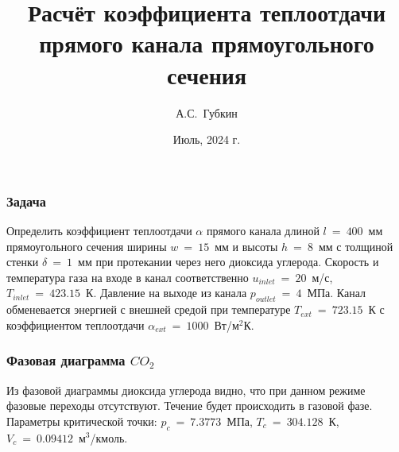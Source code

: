 \documentclass[10pt,xcolor={dvipsnames,table},aspectratio=169]{beamer}
\author[Губкин]{А.С.~Губкин}
\title[Расчёт коэффициента теплоотдачи прямого канала прямоугольного сечения]{Расчёт коэффициента теплоотдачи прямого канала прямоугольного сечения}
\date[Тюмень 2024]{Июль, 2024 г.}
\begin{document}
    \frame{\titlepage}

    \begin{frame}{}

        \justifying
        \normalsize

        \frametitle{Задача}

        Определить коэффициент теплоотдачи $ \alpha $ прямого канала длиной $ l~=~400$~мм прямоугольного сечения ширины $ w~=~15 $~мм и высоты $ h~=~8 $~мм с толщиной стенки $ \delta~=~1 $~мм при протекании через него диоксида углерода. Скорость и температура газа на входе в канал соответственно $ u_{inlet}~=~20 $~м/с, $ T_{inlet}~=~423.15 $~К. Давление на выходе из канала $ p_{outlet}~=~4 $~МПа. Канал обменевается энергией с внешней средой при температуре $ T_{ext}~=~723.15 $~К с коэффициентом теплоотдачи $ \alpha_{ext}~=~1000 $~Вт/м$^2$К.

    \end{frame}{}

    \begin{frame}{}

        \justifying
        \normalsize

        \frametitle{Фазовая диаграмма $CO_{2}$}

        \begin{minipage}[b]{0.49\linewidth}
            Из фазовой диаграммы диоксида углерода видно, что при данном режиме фазовые переходы отсутствуют. Течение будет происходить в газовой фазе. \\

            Параметры критической точки: $ p_{c}~=~7.3773 $~МПа, $ T_{c}~=~304.128 $~К, $ V_{c}~=~0.09412 $~м$^{3}$/кмоль.
        \end{minipage}
        \hfill
        \begin{minipage}{0.49\linewidth}
            \begin{figure}
                \centering
                
            \end{figure}
        \end{minipage}

    \end{frame}{}
\end{document}
